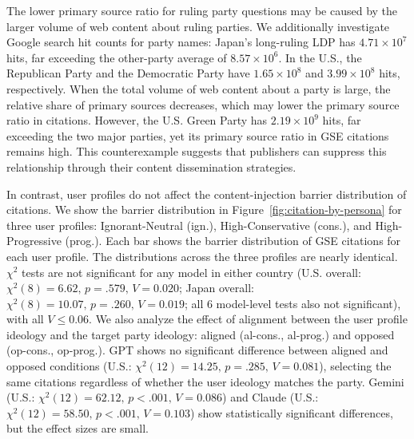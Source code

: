 The lower primary source ratio for ruling party questions may be caused by the larger volume of web content about ruling parties.
We additionally investigate Google search hit counts for party names: Japan's long-ruling LDP has $4.71 \times 10^{7}$ hits, far exceeding the other-party average of $8.57 \times 10^{6}$. In the U.S., the Republican Party and the Democratic Party have $1.65 \times 10^{8}$ and $3.99 \times 10^{8}$ hits, respectively.
When the total volume of web content about a party is large, the relative share of primary sources decreases, which may lower the primary source ratio in citations.
However, the U.S. Green Party has $2.19 \times 10^{9}$ hits, far exceeding the two major parties, yet its primary source ratio in GSE citations remains high. 
This counterexample suggests that publishers can suppress this relationship through their content dissemination strategies.

In contrast, user profiles do not affect the content-injection barrier distribution of citations.
We show the barrier distribution in Figure~\ref{fig:citation-by-persona} for three user profiles: Ignorant-Neutral (ign.), High-Conservative (cons.), and High-Progressive (prog.).
Each bar shows the barrier distribution of GSE citations for each user profile.
The distributions across the three profiles are nearly identical.
$\chi^2$ tests are not significant for any model in either country (U.S. overall: $\chi^2(8) = 6.62,\, p = .579,\, V = 0.020$; Japan overall: $\chi^2(8) = 10.07,\, p = .260,\, V = 0.019$; all 6 model-level tests also not significant), with all $V \leq 0.06$.
We also analyze the effect of alignment between the user profile ideology and the target party ideology: aligned (al-cons., al-prog.) and opposed (op-cons., op-prog.).
GPT shows no significant difference between aligned and opposed conditions (U.S.: $\chi^2(12) = 14.25,\, p = .285,\, V = 0.081$), selecting the same citations regardless of whether the user ideology matches the party.
Gemini (U.S.: $\chi^2(12) = 62.12,\, p < .001,\, V = 0.086$) and Claude (U.S.: $\chi^2(12) = 58.50,\, p < .001,\, V = 0.103$) show statistically significant differences, but the effect sizes are small.

